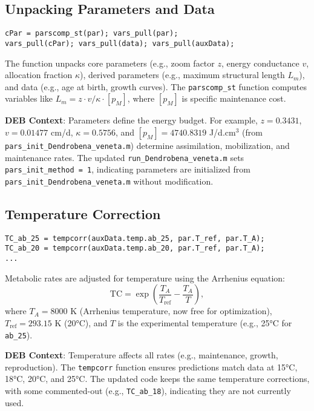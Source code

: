 \documentclass[11pt]{article}
\begin{document}
\subsection{Unpacking Parameters and Data}
\begin{verbatim}
cPar = parscomp_st(par); vars_pull(par);
vars_pull(cPar); vars_pull(data); vars_pull(auxData);
\end{verbatim}
The function unpacks core parameters (e.g., zoom factor $z$, energy conductance $v$, allocation fraction $\kappa$), derived parameters (e.g., maximum structural length $L_m$), and data (e.g., age at birth, growth curves). The \texttt{parscomp\_st} function computes variables like $L_m = z \cdot v / \kappa \cdot [p_M]$, where $[p_M]$ is specific maintenance cost.

\textbf{DEB Context}: Parameters define the energy budget. For example, $z = 0.3431$, $v = 0.01477$ cm/d, $\kappa = 0.5756$, and $[p_M] = 4740.8319$ J/d.cm$^3$ (from \texttt{pars\_init\_Dendrobena\_veneta.m}) determine assimilation, mobilization, and maintenance rates. The updated \texttt{run\_Dendrobena\_veneta.m} sets \texttt{pars\_init\_method = 1}, indicating parameters are initialized from \texttt{pars\_init\_Dendrobena\_veneta.m} without modification.

\subsection{Temperature Correction}
\begin{verbatim}
TC_ab_25 = tempcorr(auxData.temp.ab_25, par.T_ref, par.T_A);
TC_ab_20 = tempcorr(auxData.temp.ab_20, par.T_ref, par.T_A);
...
\end{verbatim}
Metabolic rates are adjusted for temperature using the Arrhenius equation:
\begin{equation}
\text{TC} = \exp\left(\frac{T_A}{T_{\text{ref}}} - \frac{T_A}{T}\right),
\end{equation}
where $T_A = 8000$ K (Arrhenius temperature, now free for optimization), $T_{\text{ref}} = 293.15$ K (20°C), and $T$ is the experimental temperature (e.g., 25°C for \texttt{ab\_25}).

\textbf{DEB Context}: Temperature affects all rates (e.g., maintenance, growth, reproduction). The \texttt{tempcorr} function ensures predictions match data at 15°C, 18°C, 20°C, and 25°C. The updated code keeps the same temperature corrections, with some commented-out (e.g., \texttt{TC\_ab\_18}), indicating they are not currently used.
\end{document}

